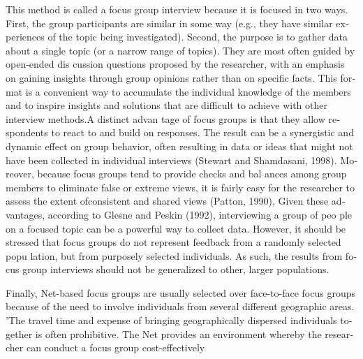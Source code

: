 \documentclass[a4 paper,12pt]{article}\usepackage{xepersian}
\begin{document}
\begin{latin}
\vspace{0.1cm}
\vspace{0.1cm}
\noindent
This method is called  a focus group interview  because  it is focused in two ways. First, the group  participants are similar in some way (e.g., they have similar experiences of the  topic being  investigated). Second, the  purpose is to gather data about  a single topic (or  a narrow   range  of topics). They are  most  often  guided  by open-ended dis­ cussion questions proposed by  the  researcher, with  an emphasis on  gaining  insights through group opinions rather than  on specific facts. This format is a convenient way to accumulate the  individual  knowledge of the  members and  to inspire insights and
solutions that  are difficult  to achieve  with other interview methods.A distinct advan­ tage of focus groups is that  they allow  respondents to react to and  build  on responses. The result  can  be a synergistic and  dynamic effect on  group behavior, often resulting in data or ideas  that  might  not have been collected in individual interviews (Stewart and Shamdasani, 1998). Moreover, because focus groups  tend  to provide checks  and  bal­ ances among group  members to eliminate false or extreme views, it is fairly easy for the researcher to assess  the  extent ofconsistent and  shared views  (Patton, 1990), Given these advantages, according to Glesne and Peskin  (1992), interviewing a group of peo­ ple  on  a focused topic can  be a powerful way  to collect  data.  However, it  should be stressed  that  focus groups  do not  represent feedback from a randomly selected  popu­ lation, but  from purposely  selected individuals. As such,  the  results from  focus group interviews should not  be generalized to other, larger populations.
\vspace{0.1cm}
\vspace{0.1cm}

\vspace{0.1cm}
\vspace{0.1cm}

\noindent
 Finally,  Net-based focus groups are  usually  selected  over face-to-face focus groups because  of the  need  to  involve individuals from   several  different geographic areas.  'The  travel  time  and  expense  of bringing geographically dispersed individuals together  is  often  prohibitive. The  Net  provides an  environment  whereby  the researcher can conduct a focus group cost-effectively
\vspace{0.1cm}
\vspace{0.1cm}


\end{latin}
\end{document}
